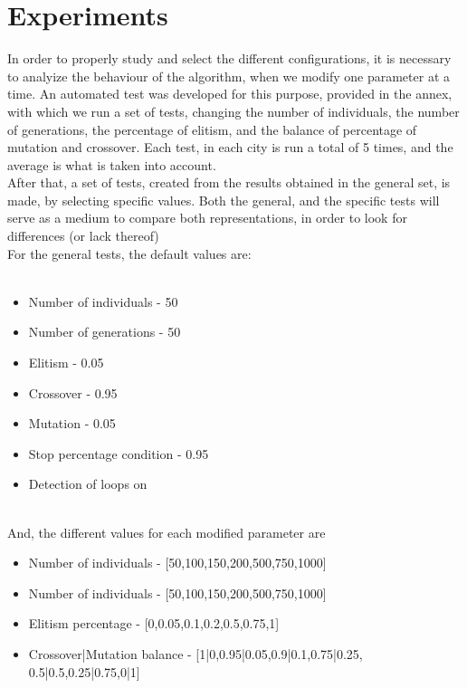 \section{Experiments}

In order to properly study and select the different configurations, it is
necessary to analyize the behaviour of the algorithm, when we modify one
parameter at a
time. An automated test was developed for this purpose, provided in the annex,
with which we run a set of tests, changing the number of individuals, the number of
generations, the percentage of elitism, and the balance of percentage of
mutation and crossover. Each test, in each city is run a total of 5 times,
and the average is what is taken into account. \\
After that, a set of tests, created from the results obtained in the general
set, is made, by selecting specific values. Both the general, and the specific
tests will serve as a medium to compare both representations, in order to look
for differences (or lack thereof)
\\
For the general tests, the default values are:\\
\\
\begin{itemize}
  \item Number of individuals - 50
  \item Number of generations - 50
  \item Elitism - 0.05
  \item Crossover - 0.95
  \item Mutation - 0.05
  \item Stop percentage condition - 0.95
  \item Detection of loops on
\end{itemize}
\\
And, the different values for each modified parameter are
\begin{itemize}
  \item Number of individuals - [50,100,150,200,500,750,1000]\\
  \item Number of individuals - [50,100,150,200,500,750,1000]\\
  \item Elitism percentage - [0,0.05,0.1,0.2,0.5,0.75,1]\\
  \item Crossover|Mutation balance - [1|0,0.95|0.05,0.9|0.1,0.75|0.25,
0.5|0.5,0.25|0.75,0|1]\\
\end {itemize}
